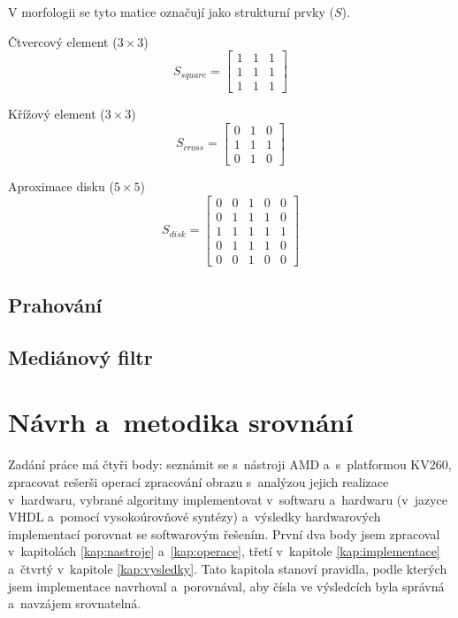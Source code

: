 \documentclass[FM,DP]{tulthesis}
\begin{document}
V morfologii se tyto matice označují jako strukturní prvky ($S$).

Čtvercový element ($3 \times 3$)
\begin{equation}
    S_{square} = \begin{bmatrix}
        1 & 1 & 1 \\
        1 & 1 & 1 \\
        1 & 1 & 1
    \end{bmatrix}
\end{equation}

Křížový element ($3 \times 3$)
\begin{equation}
    S_{cross} = \begin{bmatrix}
        0 & 1 & 0 \\
        1 & 1 & 1 \\
        0 & 1 & 0
    \end{bmatrix}
\end{equation}

Aproximace disku ($5 \times 5$)
\begin{equation}
    S_{disk} = \begin{bmatrix}
        0 & 0 & 1 & 0 & 0 \\
        0 & 1 & 1 & 1 & 0 \\
        1 & 1 & 1 & 1 & 1 \\
        0 & 1 & 1 & 1 & 0 \\
        0 & 0 & 1 & 0 & 0
    \end{bmatrix}
\end{equation}

\section{Prahování}

\section{Mediánový filtr}

\chapter{Návrh a~metodika srovnání}
\label{kap:metodika}

Zadání práce má čtyři body: seznámit se s~nástroji AMD a~s~platformou KV260,
zpracovat rešerši operací zpracování obrazu s~analýzou jejich realizace
v~hardwaru, vybrané algoritmy implementovat v~softwaru a~hardwaru (v~jazyce
\ac{VHDL} a~pomocí vysokoúrovňové syntézy) a~výsledky hardwarových implementací
porovnat se softwarovým řešením. První dva body jsem zpracoval v~kapitolách
\ref{kap:nastroje} a~\ref{kap:operace}, třetí v~kapitole \ref{kap:implementace}
a~čtvrtý v~kapitole \ref{kap:vysledky}. Tato kapitola stanoví pravidla, podle
kterých jsem implementace navrhoval a~porovnával, aby čísla ve výsledcích byla
správná a~navzájem srovnatelná.
\end{document}
